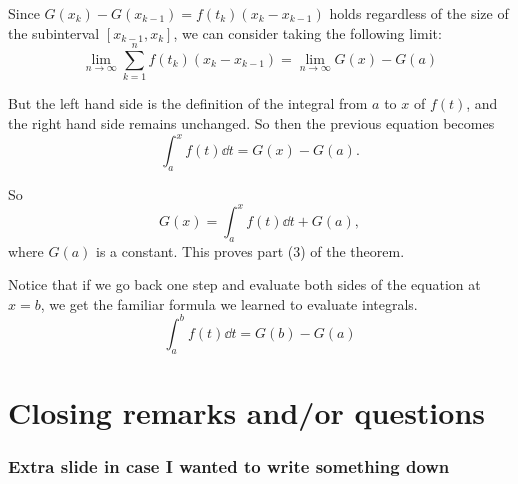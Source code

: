 \documentclass[mathserif]{beamer}
\newcommand{\sbr}[1]{\left[#1\right]}
\begin{document}
\begin{frame}
  Since $G(x_k)-G(x_{k-1}) = f(t_k)(x_k-x_{k-1})$ holds regardless of the size of the subinterval $\sbr{x_{k-1},x_k}$, we can consider taking the following limit: $$\lim_{n\to \infty}\sum_{k=1}^n f(t_k)(x_k-x_{k-1}) = \lim_{n\to \infty}  G(x) - G(a)$$

  But the left hand side is the definition of the integral from $a$ to $x$ of $f(t)$, and the right hand side remains unchanged. So then the previous equation becomes $$\int_a^x f(t)\dd{t} = G(x)-G(a).$$
\end{frame}

\begin{frame}
  So $$G(x) = \int_a^x f(t)\dd{t} + G(a),$$ where $G(a)$ is a constant. This proves part (3) of the theorem. 

  Notice that if we go back one step and evaluate both sides of the equation at $x=b$, we get the familiar formula we learned to evaluate integrals. $$\int_a^b f(t)\dd{t} = G(b)-G(a)$$
\end{frame}

\section{Closing remarks and/or questions}

\begin{frame}
  \frametitle{Extra slide in case I wanted to write something down}
\end{frame}
\end{document}
